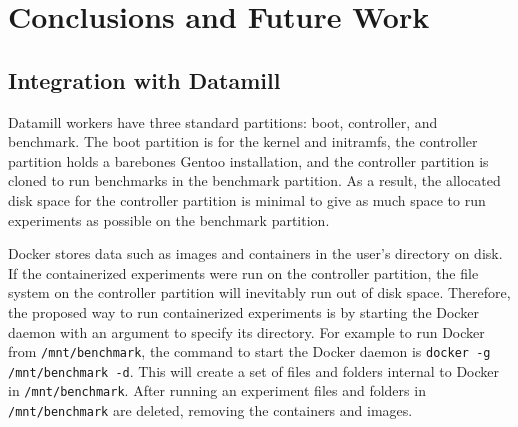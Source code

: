 \documentclass[11pt]{article}
\begin{document}
\section{Conclusions and Future Work}

\subsection{Integration with Datamill}
Datamill workers have three standard partitions: boot, controller, and benchmark. The boot partition is for the kernel and initramfs, the controller partition holds a barebones Gentoo installation, and the controller partition is cloned to run benchmarks in the benchmark partition. As a result, the allocated disk space for the controller partition is minimal to give as much space to run experiments as possible on the benchmark partition. 

Docker stores data such as images and containers in the user’s directory on disk. If the containerized experiments were run on the controller partition, the file system on the controller partition will inevitably run out of disk space. Therefore, the proposed way to run containerized experiments is by starting the Docker daemon with an argument to specify its directory. For example to run Docker from \texttt{/mnt/benchmark}, the command to start the Docker daemon is \texttt{docker -g /mnt/benchmark -d}. This will create a set of files and folders internal to Docker in \texttt{/mnt/benchmark}. After running an experiment files and folders in \texttt{/mnt/benchmark} are deleted, removing the containers and images. 
\end{document}
